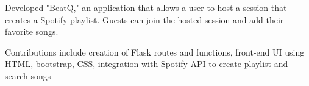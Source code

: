 \documentclass[]{deedy-resume-openfont}
\begin{document}
\begin{minipage}[t]{0.67\textwidth}
\begin{tightemize}
\item Developed "BeatQ," an application that allows a user to host a session that  creates a Spotify playlist. Guests can join the hosted session and add their favorite songs.
\item Contributions include creation of Flask routes and functions, front-end UI using HTML, bootstrap, CSS, integration with Spotify API to create playlist and search songs
\end{tightemize}
\sectionsep

\end{minipage} 
\end{document}
